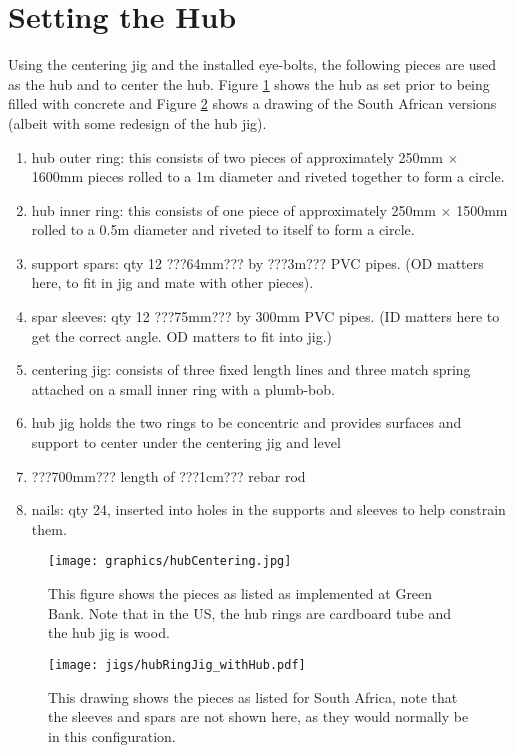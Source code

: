 \documentclass[11pt]{article}
\begin{document}
\section{Setting the Hub}
Using the centering jig and the installed eye-bolts, the following pieces are used as the hub and to center the hub.  Figure \ref{fig:centeredHub} shows the hub as set prior to being filled with concrete and Figure \ref{fig:centeredHubDrawing} shows a drawing of the South African versions (albeit with some redesign of the hub jig).

\begin{enumerate}
\item hub outer ring:  this consists of two pieces of approximately 250mm $\times$ 1600mm pieces rolled to a 1m diameter and riveted together to form a circle.
\item hub inner ring:  this consists of one piece of approximately 250mm $\times$ 1500mm rolled to a 0.5m diameter and riveted to itself to form a circle.
\item support spars:  qty 12 ???64mm??? by ???3m??? PVC pipes. (OD matters here, to fit in jig and mate with other pieces).
\item spar sleeves:  qty 12 ???75mm??? by 300mm PVC pipes.  (ID matters here to get the correct angle.  OD matters to fit into jig.)
\item centering jig: consists of three fixed length lines and three match spring attached on a small inner ring with a plumb-bob.
\item hub jig holds the two rings to be concentric and provides surfaces and support to center under the centering jig and level
\item ???700mm??? length of ???1cm??? rebar rod
\item nails:  qty 24, inserted into holes in the supports and sleeves to help constrain them.
\end{enumerate}

\begin{figure}[H]
\centering
\texttt{[image: graphics/hubCentering.jpg]}
\caption{This figure shows the pieces as listed as implemented at Green Bank.  Note that in the US, the hub rings are cardboard tube and the hub jig is wood.}
\label{fig:centeredHub}
\end{figure}

\begin{figure}[H]
\centering
\texttt{[image: jigs/hubRingJig\_withHub.pdf]}
\caption{This drawing shows the pieces as listed for South Africa, note that the sleeves and spars are not shown here, as they would normally be in this configuration.}
\label{fig:centeredHubDrawing}
\end{figure}
\end{document}
